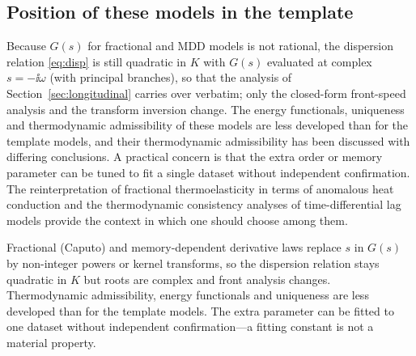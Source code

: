 \subsection{Position of these models in the template}
Because $G(s)$ for fractional and MDD models is not rational, the dispersion relation \eqref{eq:disp} is still quadratic in $K$ with $G(s)$ evaluated at complex $s=-\ii\omega$ (with principal branches), so that the analysis of Section~\ref{sec:longitudinal} carries over verbatim; only the closed-form front-speed analysis and the transform inversion change. The energy functionals, uniqueness and thermodynamic admissibility of these models are less developed than for the template models, and their thermodynamic admissibility has been discussed with differing conclusions. A practical concern is that the extra order or memory parameter can be tuned to fit a single dataset without independent confirmation. The reinterpretation of fractional thermoelasticity in terms of anomalous heat conduction \citep{Yu2024} and the thermodynamic consistency analyses of time-differential lag models \citep{Chirita2016,Tibullo2017} provide the context in which one should choose among them.

\begin{summarybox}[Summary]
Fractional (Caputo) and memory-dependent derivative laws replace $s$ in $G(s)$ by non-integer powers or kernel transforms, so the dispersion relation stays quadratic in $K$ but roots are complex and front analysis changes. Thermodynamic admissibility, energy functionals and uniqueness are less developed than for the template models. The extra parameter can be fitted to one dataset without independent confirmation---a fitting constant is not a material property.
\end{summarybox}

